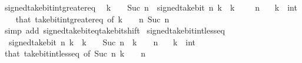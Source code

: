 \begin{isabellebody}
\endisatagproof
{\isafoldproof}%
%
\isadelimproof
\isanewline
%
\endisadelimproof
\isanewline
{}\isamarkupfalse%
\ signed{\isacharunderscore}{\kern0pt}take{\isacharunderscore}{\kern0pt}bit{\isacharunderscore}{\kern0pt}int{\isacharunderscore}{\kern0pt}greater{\isacharunderscore}{\kern0pt}eq{\isacharcolon}{\kern0pt}\isanewline
\ \ {\isacartoucheopen}k\ {\isacharplus}{\kern0pt}\ {}\ {\isacharcircum}{\kern0pt}\ Suc\ n\ {\isasymle}\ signed{\isacharunderscore}{\kern0pt}take{\isacharunderscore}{\kern0pt}bit\ n\ k{\isacartoucheclose}\ \ {\isacartoucheopen}k\ {\isacharless}{\kern0pt}\ {\isacharminus}{\kern0pt}\ {\isacharparenleft}{\kern0pt}{}\ {\isacharcircum}{\kern0pt}\ n{\isacharparenright}{\kern0pt}{\isacartoucheclose}\isanewline
\ \ \ k\ {\isacharcolon}{\kern0pt}{\isacharcolon}{\kern0pt}\ int\isanewline
%
\isadelimproof
\ \ %
\endisadelimproof
%
\isatagproof
{}\isamarkupfalse%
\ that\ take{\isacharunderscore}{\kern0pt}bit{\isacharunderscore}{\kern0pt}int{\isacharunderscore}{\kern0pt}greater{\isacharunderscore}{\kern0pt}eq\ {\isacharbrackleft}{\kern0pt}of\ {\isacartoucheopen}k\ {\isacharplus}{\kern0pt}\ {}\ {\isacharcircum}{\kern0pt}\ n{\isacartoucheclose}\ {\isacartoucheopen}Suc\ n{\isacartoucheclose}{\isacharbrackright}{\kern0pt}\isanewline
\ \ \isamarkupfalse%
\ {\isacharparenleft}{\kern0pt}simp\ add{\isacharcolon}{\kern0pt}\ signed{\isacharunderscore}{\kern0pt}take{\isacharunderscore}{\kern0pt}bit{\isacharunderscore}{\kern0pt}eq{\isacharunderscore}{\kern0pt}take{\isacharunderscore}{\kern0pt}bit{\isacharunderscore}{\kern0pt}shift{\isacharparenright}{\kern0pt}%
\endisatagproof
{\isafoldproof}%
%
\isadelimproof
\isanewline
%
\endisadelimproof
\isanewline
{}\isamarkupfalse%
\ signed{\isacharunderscore}{\kern0pt}take{\isacharunderscore}{\kern0pt}bit{\isacharunderscore}{\kern0pt}int{\isacharunderscore}{\kern0pt}less{\isacharunderscore}{\kern0pt}eq{\isacharcolon}{\kern0pt}\isanewline
\ \ {\isacartoucheopen}signed{\isacharunderscore}{\kern0pt}take{\isacharunderscore}{\kern0pt}bit\ n\ k\ {\isasymle}\ k\ {\isacharminus}{\kern0pt}\ {}\ {\isacharcircum}{\kern0pt}\ Suc\ n{\isacartoucheclose}\ \ {\isacartoucheopen}k\ {\isasymge}\ {}\ {\isacharcircum}{\kern0pt}\ n{\isacartoucheclose}\isanewline
\ \ \ k\ {\isacharcolon}{\kern0pt}{\isacharcolon}{\kern0pt}\ int\isanewline
%
\isadelimproof
\ \ %
\endisadelimproof
%
\isatagproof
{}\isamarkupfalse%
\ that\ take{\isacharunderscore}{\kern0pt}bit{\isacharunderscore}{\kern0pt}int{\isacharunderscore}{\kern0pt}less{\isacharunderscore}{\kern0pt}eq\ {\isacharbrackleft}{\kern0pt}of\ {\isacartoucheopen}Suc\ n{\isacartoucheclose}\ {\isacartoucheopen}k\ {\isacharplus}{\kern0pt}\ {}\ {\isacharcircum}{\kern0pt}\ n{\isacartoucheclose}{\isacharbrackright}{\kern0pt}\isanewline

\end{isabellebody}
